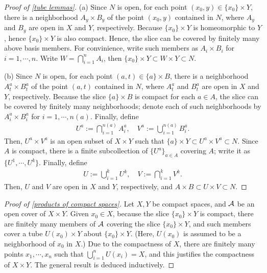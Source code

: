 \begin{proof}[Proof of \cref{tube lemmas}]
    \hangindent=0.65cm
    (a)
    Since $N$ is open, for each point $(x_0, y)\in\{x_0\}\times Y$, there is a neighborhood $A_y\times B_y$ of the point $(x_0, y)$ contained in $N$, where $A_y$ and $B_y$ are open in $X$ and $Y$, respectively.
    Because $\{x_0\}\times Y$ is homeomorphic to $Y$, hence $\{x_0\}\times Y$ is also compact.
    Hence, the slice can be covered by finitely many above basis members.
    For convinience, write such members as $A_i\times B_i$ for $i=1, \cdots, n$.
    Write $W=\bigcap_{i=1}^n A_i$, then $\{x_0\}\times Y\subset W\times Y\subset N$.
    
    \noindent(b)
    Since $N$ is open, for each point $(a, t)\in\{a\}\times B$, there is a neighborhood $A_t^a\times B_t^a$ of the point $(a, t)$ contained in $N$, where $A_t^a$ and $B_t^a$ are open in $X$ and $Y$, respectively.
    Because the slice $\{a\}\times B$ is compact for each $a\in A$, the slice can be covered by finitely many neighborhoods; denote each of such neighborhoods by $A_i^a\times B_i^a$ for $i=1, \cdots, n(a)$.
    Finally, define
    \begin{align*}
        U^a:=\bigcap_{i=1}^{n(a)}{A_i^a},\quad V^a:=\bigcup_{i=1}^{n(a)}{B_i^a}.
    \end{align*}
    Then, $U^a\times V^a$ is an open subset of $X\times Y$ such that $\{a\}\times Y\subset U^a\times V^a\subset N$.
    Since $A$ is compact, there is a finite subcollection of $\{U^a\}_{a\in A}$ covering $A$; write it as $\{U^1, \cdots, U^k\}$.
    Finally, define
    \begin{align*}
        U:=\bigcup_{i=1}^k U^k,\quad V:=\bigcap_{i=1}^k V^k.
    \end{align*}
    Then, $U$ and $V$ are open in $X$ and $Y$, respectively, and $A\times B\subset U\times V\subset N$.
\end{proof}
\begin{proof}[Proof of \cref{products of compact spaces}]
    Let $X, Y$ be compact spaces, and ${\mathcal{A}}$ be an open cover of $X\times Y$.
    Given $x_0\in X$, because the slice $\{x_0\}\times Y$ is compact, there are finitely many members of ${\mathcal{A}}$ covering the slice $\{x_0\}\times Y$, and such members cover a tube $U(x_0)\times Y$ about $\{x_0\}\times Y$. (Here, $U(x_0)$ is assumed to be a neighborhood of $x_0$ in $X$.)
    Due to the compactness of $X$, there are finitely many points $x_1, \cdots, x_n$ such that $\bigcup_{i=1}^n U(x_i)=X$, and this justifies the compactness of $X\times Y$.
    The general result is deduced inductively.
\end{proof}

